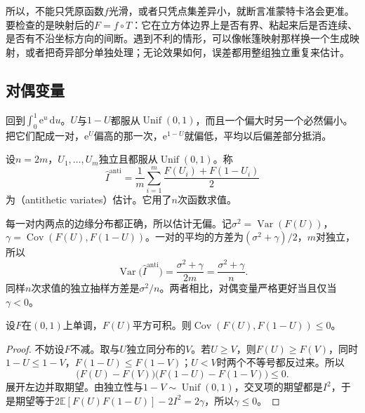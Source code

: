 所以，不能只凭原函数$f$光滑，或者只凭点集差异小，就断言准蒙特卡洛会更准。要检查的是映射后的$F=f\circ T$：它在立方体边界上是否有界、粘起来后是否连续、是否有不沿坐标方向的间断。遇到不利的情形，可以像帐篷映射那样换一个生成映射，或者把奇异部分单独处理；无论效果如何，误差都用整组独立重复来估计。

\subsection{对偶变量}
\label{sec:vr-antithetic}

回到$\int_0^1\mathrm{e}^{u}\,\mathrm{d}u$。$U$与$1-U$都服从$\operatorname{Unif}(0,1)$，而且一个偏大时另一个必然偏小。把它们配成一对，$\mathrm{e}^{U}$偏高的那一次，$\mathrm{e}^{1-U}$就偏低，平均以后偏差部分抵消。

\begin{definition}[对偶变量估计]
\label{def:vr-antithetic}
设$n=2m$，$U_1,\dots,U_m$独立且都服从$\operatorname{Unif}(0,1)$。称
\begin{equation}
 \hat{I}^{\mathrm{anti}}=\frac1m\sum_{i=1}^{m}\frac{F(U_i)+F(1-U_i)}{2}
 \label{eq:vr-antithetic}
\end{equation}
为（antithetic variates）估计。它用了$n$次函数求值。
\end{definition}

每一对内两点的边缘分布都正确，所以估计无偏。记$\sigma^2=\operatorname{Var}(F(U))$，$\gamma=\operatorname{Cov}(F(U),F(1-U))$。一对的平均的方差为$(\sigma^2+\gamma)/2$，$m$对独立，所以
\begin{equation}
 \operatorname{Var}\bigl(\hat{I}^{\mathrm{anti}}\bigr)=\frac{\sigma^2+\gamma}{2m}=\frac{\sigma^2+\gamma}{n} .
 \label{eq:vr-antithetic-variance}
\end{equation}
同样$n$次求值的独立抽样方差是$\sigma^2/n$。两者相比，对偶变量严格更好当且仅当$\gamma<0$。

\begin{theorem}[单调函数的对偶协方差]
\label{thm:vr-antithetic-monotone}
设$F$在$(0,1)$上单调，$F(U)$平方可积。则$\operatorname{Cov}(F(U),F(1-U))\leq0$。
\end{theorem}

\begin{proof}
不妨设$F$不减。取与$U$独立同分布的$V$。若$U\geq V$，则$F(U)\geq F(V)$，同时$1-U\leq1-V$，$F(1-U)\leq F(1-V)$；$U<V$时两个不等号都反过来。所以
\[
 \bigl(F(U)-F(V)\bigr)\bigl(F(1-U)-F(1-V)\bigr)\leq0 .
\]
展开左边并取期望。由独立性与$1-V\sim\operatorname{Unif}(0,1)$，交叉项的期望都是$I^2$，于是期望等于$2\mathbb{E}[F(U)F(1-U)]-2I^2=2\gamma$，所以$\gamma\leq0$。
\end{proof}

